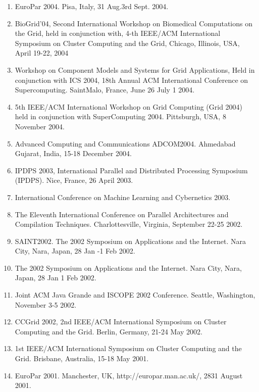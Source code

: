 \documentclass{article}
\begin{document}
\begin{enumerate}
\item  EuroPar 2004. Pisa, Italy, 31 Aug.3rd Sept. 2004. %
\item  BioGrid'04, Second International Workshop on Biomedical Computations on the Grid, held in conjunction with, 4-th IEEE/ACM International Symposium on Cluster Computing and the Grid, Chicago, Illinois, USA, April 19-22, 2004 
\item  Workshop on Component Models and Systems for Grid Applications, Held in conjunction with ICS 2004, 18th Annual ACM International Conference on Supercomputing. SaintMalo, France, June 26 July 1 2004. 
\item  5th IEEE/ACM International Workshop on Grid Computing (Grid 2004) held in conjunction with SuperComputing 2004. Pittsburgh, USA, 8 November 2004.  %
\item  Advanced Computing and Communications ADCOM2004. Ahmedabad Gujarat, India, 15-18 December 2004. 
\item  IPDPS 2003, International Parallel and Distributed Processing Symposium (IPDPS). Nice, France, 26 April 2003. 
\item  International Conference on Machine Learning and Cybernetics 2003. %
\item  The Eleventh International Conference on Parallel Architectures and Compilation Techniques. Charlottesville, Virginia, September 22-25 2002. 
\item  SAINT2002. The 2002 Symposium on Applications and the Internet. Nara City, Nara, Japan, 28 Jan -1 Feb 2002. %
\item  The 2002 Symposium on Applications and the Internet. Nara City, Nara, Japan, 28 Jan 1 Feb 2002. %
\item  Joint ACM Java Grande and ISCOPE 2002 Conference. Seattle, Washington, November 3-5 2002. %
\item  CCGrid 2002, 2nd IEEE/ACM International Symposium on Cluster Computing and the Grid. Berlin, Germany, 21-24 May 2002. %
\item  1st IEEE/ACM International Symposium on Cluster Computing and the Grid. Brisbane, Australia, 15-18 May 2001. 
\item  EuroPar 2001. Manchester, UK, http://europar.man.ac.uk/, 2831 August 2001. 

\end{enumerate}
\end{document}
